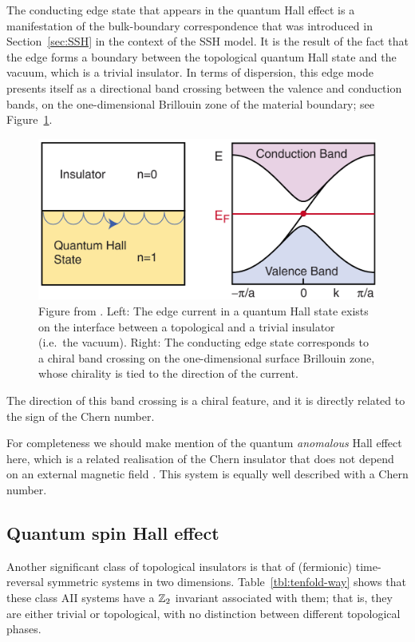 The conducting edge state that appears in the quantum Hall effect is a manifestation of the bulk-boundary correspondence that was introduced in Section~\ref{sec:SSH} in the context of the SSH model. It is the result of the fact that the edge forms a boundary between the topological quantum Hall state and the vacuum, which is a trivial insulator. In terms of dispersion, this edge mode presents itself as a directional band crossing between the valence and conduction bands, on the one-dimensional Brillouin zone of the material boundary; see Figure~\ref{fig:QHE_edge-state}.
\begin{figure}[htb!]
	\centering
	\includegraphics[width=.75\linewidth]{Images/QHE_edge-state}
	\caption{Figure from \cite{HasanKane_colloquium}. Left: The edge current in a quantum Hall state exists on the interface between a topological and a trivial insulator (i.e.\ the vacuum). Right: The conducting edge state corresponds to a chiral band crossing on the one-dimensional surface Brillouin zone, whose chirality is tied to the direction of the current.}
	\label{fig:QHE_edge-state}
\end{figure}
The direction of this band crossing is a chiral feature, and it is directly related to the sign of the Chern number.

For completeness we should make mention of the quantum \emph{anomalous} Hall effect here, which is a related realisation of the Chern insulator that does not depend on an external magnetic field \cite{Haldane_QAHE}. This system is equally well described with a Chern number.


\subsection{Quantum spin Hall effect}\label{sec:QSHE}

Another significant class of topological insulators is that of (fermionic) time-reversal symmetric systems in two dimensions. Table~\ref{tbl:tenfold-way} shows that these class AII systems have a $\mathbb{Z}_2$ invariant associated with them; that is, they are either trivial or topological, with no distinction between different topological phases.

